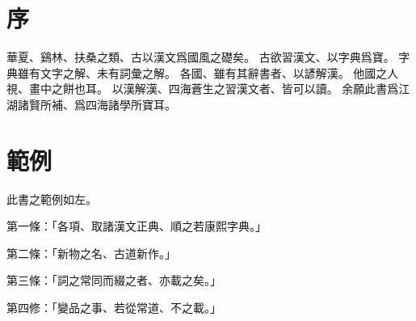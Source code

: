 \section{序}
華夏、鷄林、扶桑之類、古以漢文爲國風之礎矣。
古欲習漢文、以字典爲寶。
字典雖有文字之解、未有詞彙之解。
各國、雖有其辭書者、以諺解漢。
他國之人視、畫中之餅也耳。
以漢解漢、四海蒼生之習漢文者、皆可以讀。
余願此書爲江湖諸賢所補、爲四海諸學所寶耳。
\section{範例}
此書之範例如左。
\par 第一條：「各項、取諸漢文正典、順之若康熙字典。」
\par 第二條：「新物之名、古道新作。」
\par 第三條：「詞之常同而綴之者、亦載之矣。」
\par 第四修：「變品之事、若從常道、不之載。」

